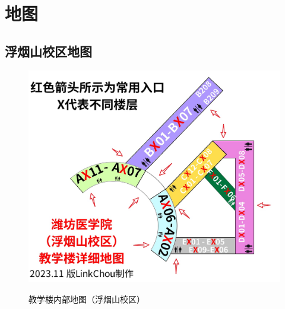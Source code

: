 \chapter[地图]{地图}

\section[浮烟山校区地图]{浮烟山校区地图\footnotemark}
\begin{figure}[H]
    \centering
    \caption[map_teach]{教学楼内部地图（浮烟山校区）}
    \vspace{1em}
    \includegraphics*[width=.9\textwidth]{教学楼_updated.jpg}
    \label{map_t}
\end{figure}

